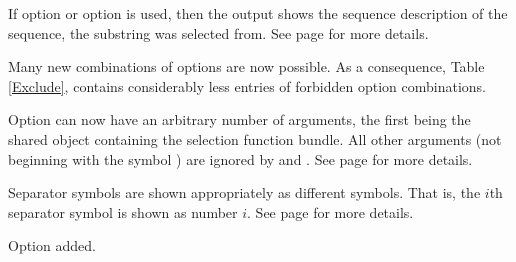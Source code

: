 \documentclass[12pt,titlepage]{article}
\newcommand{\Recentdetails}[1]{See page \pageref{#1} for more details\xspace}
\begin{document}
If option  or option  is used,
then the output shows the sequence description of the sequence,
the substring was selected from.
\Recentdetails{VSSS}.

\begin{AboutVmatch}

Many new combinations of options are now possible. As a consequence,
Table \ref{Exclude}, contains considerably less entries of forbidden
option combinations.

Option  can now have an arbitrary number 
of arguments, the first being the shared object containing the
selection function bundle. All other arguments (not beginning with
the symbol \texttt{}) are ignored by \VM and \VMS.
\Recentdetails{SELFUNoption}.

\end{AboutVmatch}

Separator symbols are shown appropriately as different symbols.
That is, the \(i\)th separator symbol is shown as number \(i\).
\Recentdetails{VtoTex}.

Option  added.
\end{document}
